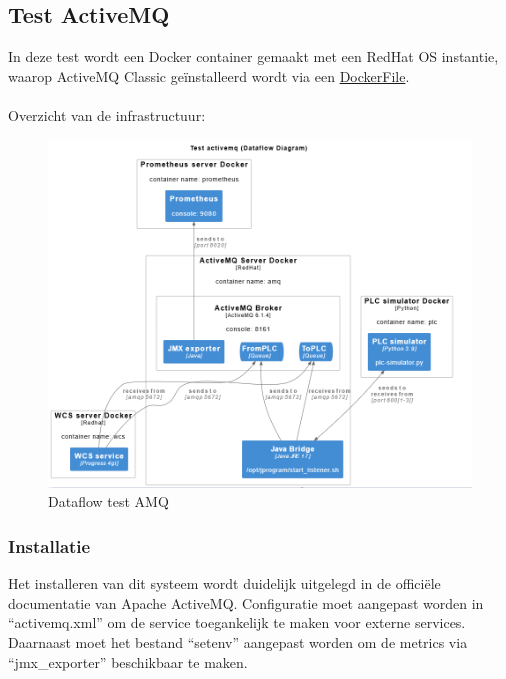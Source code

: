 \subsection{Test ActiveMQ}
In deze test wordt een Docker container gemaakt met een RedHat OS instantie, waarop ActiveMQ Classic 
geïnstalleerd wordt via een \hyperref[listing:docker_amq]{DockerFile}.
\\\\
Overzicht van de infrastructuur:
\begin{figure}[h!]
  \centering
  \includegraphics[width=.95\textwidth]{img/test_amq_dataflow.png}
  \caption{\label{fig:test_amq_dataflow}Dataflow test AMQ}
\end{figure}

\subsubsection{Installatie}
Het installeren van dit systeem wordt duidelijk uitgelegd in de officiële documentatie van Apache ActiveMQ.
Configuratie moet aangepast worden in ``activemq.xml'' om de service toegankelijk te maken voor externe services.
Daarnaast moet het bestand ``setenv'' aangepast worden om de metrics via ``jmx\_exporter'' beschikbaar te maken.

